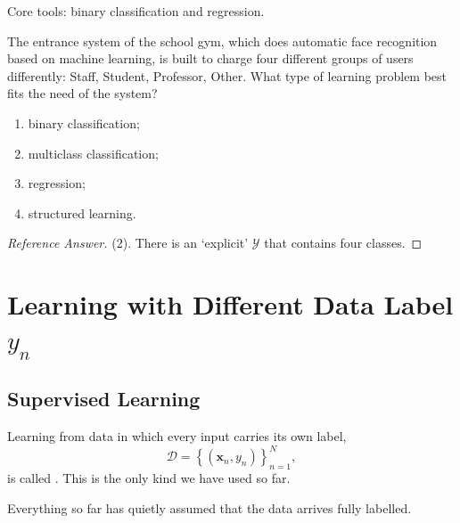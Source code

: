 \begin{moral}
    Core tools: binary classification and regression.
\end{moral}

\begin{exercise}
    The entrance system of the school gym, which does automatic face recognition
    based on machine learning, is built to charge four different groups of users
    differently: Staff, Student, Professor, Other. What type of learning problem
    best fits the need of the system?
    \begin{enumerate}[(1)]
        \item binary classification;
        \item multiclass classification;
        \item regression;
        \item structured learning.
    \end{enumerate}
\end{exercise}

\begin{proof}[Reference Answer]
    (2). There is an `explicit' \(\mathcal{Y}\) that contains four classes.
\end{proof}

\section{Learning with Different Data Label
\texorpdfstring{\(y_n\)}{yn}}\label{sec:labels}


\subsection{Supervised Learning}

\begin{definition}\label{def:supervised}
    Learning from data in which every input carries its own label,
    \[
        \mathcal{D} = \left\{ (\bm{x}_n, y_n) \right\}_{n=1}^{N} ,
    \]
    is called . This is the only kind we have used so
    far.
\end{definition}

Everything so far has quietly assumed that the data arrives fully labelled.

